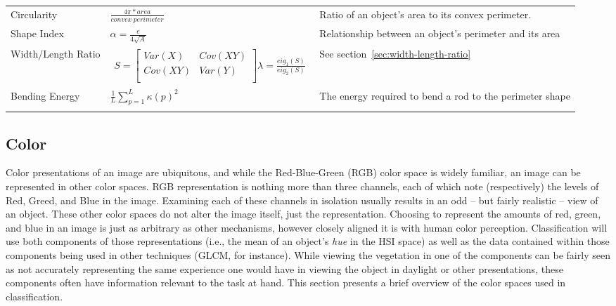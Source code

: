 \documentclass[letterpaper]{article}
\begin{document}
{{\begin{longtable}{x{\dimexpr.15\tabcolsep}
                  x{\dimexpr.425\tabcolsep}
                  x{\dimexpr.425\tabcolsep}}
		Circularity    
		& $\frac{4\pi * area}{convex~perimeter}$ 
		& Ratio of an object's area to its convex perimeter. 
\tabularnewline\addlinespace


		Shape Index    
		& $\alpha = \frac {e} {4 \sqrt{A}}$ 
		&  Relationship between an object's perimeter and its area
\tabularnewline\addlinespace

		Width/Length Ratio
		& \begin{minipage}[h]{0.10\textwidth}
			\begin{eqnarray*}
				S = 
				\begin{bmatrix}
					Var(X) & Cov(XY) \\[0.10em]
					Cov(XY) & Var(Y) \\[0.10em]
				\end{bmatrix}
			\lambda = \frac {eig_{1}(S)} {eig_{2}(S)}
			\end{eqnarray*}
		  \end{minipage}
		& See section~\ref{sec:width-length-ratio}
\tabularnewline\addlinespace

		Bending Energy    
		& $\frac{1}{L} \sum_{p=1}^{L}\kappa(p)^2$ 
		&  The energy required to bend a rod to the perimeter shape
\tabularnewline\addlinespace

\label{table:shape-formulae}
\end{longtable}
}


%
%
\subsection{Color}
Color presentations of an image are ubiquitous, and while the Red-Blue-Green (RGB) color space is widely familiar, an image can be represented in other color spaces. RGB representation is nothing more than three channels, each of which note (respectively) the levels of Red, Greed, and Blue in the image.  Examining each of these channels in isolation usually results in an odd -- but fairly realistic -- view of an object. These other color spaces do not alter the image itself, just the representation.  Choosing to represent the amounts of red, green, and blue in an image is just as arbitrary as other mechanisms, however closely aligned it is with human color perception. Classification will use both components of those representations (i.e., the mean of an object's \textit{hue} in the HSI space) as well as the data contained within those components being used in other techniques (GLCM, for instance). While viewing the vegetation in one of the components can be fairly seen as not accurately representing the same experience one would have in viewing the object in daylight or other presentations, these components often have information relevant to the task at hand. This section presents a brief overview of the color spaces used in classification.

}
\end{document}

